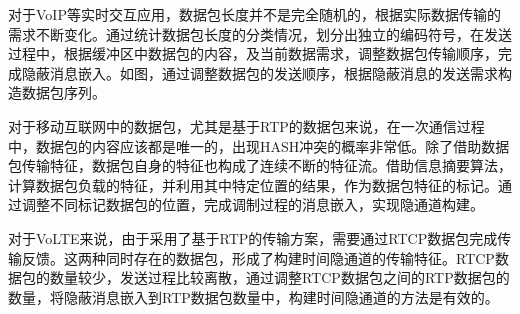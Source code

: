
对于VoIP等实时交互应用，数据包长度并不是完全随机的，根据实际数据传输的需求不断变化。通过统计数据包长度的分类情况，划分出独立的编码符号，在发送过程中，根据缓冲区中数据包的内容，及当前数据需求，调整数据包传输顺序，完成隐蔽消息嵌入。如图，通过调整数据包的发送顺序，根据隐蔽消息的发送需求构造数据包序列。

对于移动互联网中的数据包，尤其是基于RTP的数据包来说，在一次通信过程中，数据包的内容应该都是唯一的，出现HASH冲突的概率非常低。除了借助数据包传输特征，数据包自身的特征也构成了连续不断的特征流。借助信息摘要算法，计算数据包负载的特征，并利用其中特定位置的结果，作为数据包特征的标记。通过调整不同标记数据包的位置，完成调制过程的消息嵌入，实现隐通道构建。

对于VoLTE来说，由于采用了基于RTP的传输方案，需要通过RTCP数据包完成传输反馈。这两种同时存在的数据包，形成了构建时间隐通道的传输特征。RTCP数据包的数量较少，发送过程比较离散，通过调整RTCP数据包之间的RTP数据包的数量，将隐蔽消息嵌入到RTP数据包数量中，构建时间隐通道的方法是有效的。


